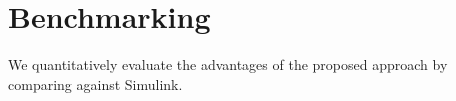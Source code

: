 \section{Benchmarking}
\label{sec:benchmarking}
We quantitatively evaluate the advantages of the
proposed approach by comparing against Simulink. 